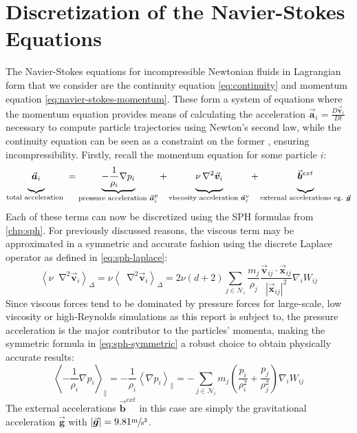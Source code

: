 \documentclass[oneside, a4paper]{book}
\newcommand\abs[1]{\left|#1\right|}
\newcommand\angled[1]{\left\langle#1\right\rangle}
\newcommand*\Laplace{\mathop{}\!\mathbin\nabla^2}
\newcommand\vek[1]{\vec{\bm{#1}}}
\newcommand\br[1]{\left(#1\right)}
\begin{document}
    \section{Discretization of the Navier-Stokes Equations}\label{sec:sph-navier-stokes}
    The Navier-Stokes equations for incompressible Newtonian fluids in Lagrangian form that we consider are the continuity equation \autoref{eq:continuity} and momentum equation \autoref{eq:navier-stokes-momentum}. These form a system of equations where the momentum equation provides means of calculating the acceleration $\vek{a}_i = \frac{D\vek{v}_i}{Dt}$ necessary to compute particle trajectories using Newton's second law, while the continuity equation can be seen as a constraint on the former \autocite{tutorial2019}, ensuring incompressibility. Firstly, recall the momentum equation for some particle $i$:
    \begin{equation}
      \underbrace{\vek{a}_i  \vphantom{\frac{1}{\rho_i}\nabla}}
        _{\text{total acceleration }}=
      \underbrace{-\frac{1}{\rho_i}\nabla p_i}
        _{\text{pressure acceleration }\vek{a}_i^p} + 
      \underbrace{\nu\Laplace\vek{v}_i  \vphantom{\frac{1}{\rho_i}\nabla}}
        _{\text{viscosity acceleration }\vek{a}_i^\nu}+
      \underbrace{\vek{b}^{ext} \vphantom{\frac{1}{\rho_i}\nabla}}
        _{\text{external accelerations eg. }\vek{g}}
    \end{equation}
    Each of these terms can now be discretized using the SPH formulas from \autoref{chp:sph}. For previously discussed reasons, the viscous term may be approximated in a symmetric and accurate fashion using the discrete Laplace operator as defined in \autoref{eq:sph-laplace}:
    \begin{equation}\label{eq:discrete-viscous}
      \angled{\nu\Laplace\vek{v}_i}_\Delta = \nu\angled{\Laplace\vek{v}_i}_\Delta = 2\nu(d+2)\sum_{j\in\mathcal{N}_i}\frac{m_j}{\rho_j} \frac{\vek{v}_{ij}\cdot\vek{x}_{ij}}{\abs{\vek{x}_{ij}}^2}\nabla_i W_{ij}
    \end{equation}
    Since viscous forces tend to be dominated by pressure forces for large-scale, low viscosity or high-Reynolds simulations as this report is subject to, the pressure acceleration is the major contributor to the particles' momenta, making the symmetric formula in \autoref{eq:sph-symmetric} a robust choice to obtain physically accurate results:
    \begin{equation}\label{eq:discrete-pressure}
      \angled{-\frac{1}{\rho_i}\nabla p_i}_\parallel 
      = -\frac{1}{\rho_i}\angled{\nabla p_i}_\parallel 
      = -\sum_{j\in\mathcal{N}_i} m_j \br{\frac{p_i}{\rho_i^2} + \frac{p_j}{\rho_j^2}} \nabla_iW_{ij}
    \end{equation}
    The external accelerations $\vek{b}^{ext}$ in this case are simply the gravitational acceleration $\vek{g}$ with $\abs{\vek{g}}=9.81\sfrac{\si{\meter}}{\si{\second}^2}$. 
\end{document}
